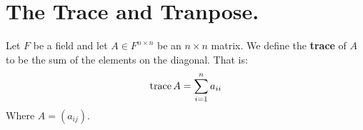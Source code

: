 
\section{The Trace and Tranpose.}
\label{section5}

\begin{definition}
    Let $F$ be a field and let  $A \in F^{n \times n}$ be an $n \times n$
    matrix. We define the  \textbf{trace} of $A$ to be the sum of the elements
    on the diagonal. That is:
        \begin{equation}
            \operatorname{trace}{A}=\sum_{i=1}^{n}{a_{ii}}
        \end{equation}
    Where $A=(a_{ij})$.
\end{definition}
